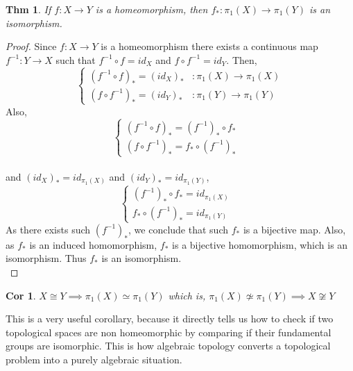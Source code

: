 \documentclass[paper=a4, fontsize=11pt]{scrartcl}
\newtheorem{theorem}{Thm}
\newtheorem{corollary}{Cor}
\begin{document}
\begin{theorem}
	If $f:X\to Y$ is a homeomorphism, then $f_*:\pi_1(X) \to \pi_1(Y)$ is an isomorphism.\\
\end{theorem}

\begin{proof}
	Since $f:X\to Y$ is a homeomorphism there exists a continuous map $f^{-1}:Y\to X$ such that $f^{-1} \circ f = id_X $ and $f \circ f^{-1} = id_Y$. Then,\\
	\begin{equation}\nonumber
		\begin{cases}
		(f^{-1} \circ f)_*= (id_X)_* & : \pi_1(X) \to \pi_1(X)\\
		(f \circ f^{-1} )_* = (id_Y)_* & : \pi_1(Y) \to \pi_1(Y)
		\end{cases}
	\end{equation}
	Also, 
	\begin{equation}\nonumber
	\begin{cases}
	(f^{-1} \circ f)_*= (f^{-1})_* \circ f_* & \\
	(f \circ f^{-1} )_* = f_* \circ (f^{-1})_* &
	\end{cases}
	\end{equation}\\
	and $(id_X)_* = id_{\pi_1(X)}$ and $(id_Y)_* = id_{\pi_1(Y)}$,
	\begin{equation}\nonumber
		\begin{cases}
			(f^{-1})_* \circ f_* = id_{\pi_1(X)}& \\
			f_* \circ (f^{-1})_* = id_{\pi_1(Y)}&
		\end{cases}
	\end{equation}
	As there exists such $(f^{-1})_*$, we conclude that such $f_*$ is a bijective map. Also, as $f_*$ is an induced homomorphism, $f_*$ is a bijective homomorphism, which is an isomorphism. Thus $f_*$ is an isomorphism.\\
\end{proof}

\begin{corollary}
	$X \cong Y \implies \pi_1(X) \simeq \pi_1(Y)$ which is, $\pi_1(X) \not\simeq \pi_1(Y) \implies X \not\cong Y$\\
\end{corollary}

This is a very useful corollary, because it directly tells us how to check if two topological spaces are non homeomorphic by comparing if their fundamental groups are isomorphic. This is how algebraic topology converts a topological problem into a purely algebraic situation.\\
\end{document}
